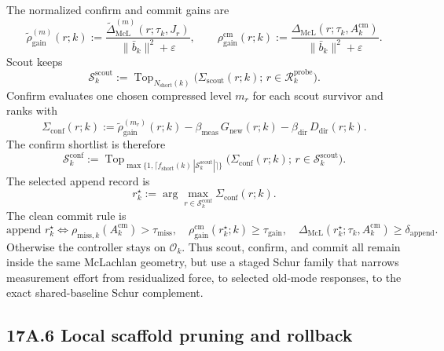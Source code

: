 \documentclass[11pt]{article}
\begin{document}
The normalized confirm and commit gains are
\[
\widetilde\rho_{\mathrm{gain}}^{(m)}(r;k)
:=
\frac{\widetilde\Delta_{\mathrm{McL}}^{(m)}(r;\tau_k,J_r)}{\|\bar b_k\|^2+\varepsilon},
\qquad
\rho_{\mathrm{gain}}^{\mathrm{cm}}(r;k)
:=
\frac{\Delta_{\mathrm{McL}}(r;\tau_k,A_k^{\mathrm{cm}})}{\|\bar b_k\|^2+\varepsilon}.
\]
Scout keeps
\[
\mathcal S_k^{\mathrm{scout}}
:=
\operatorname{Top}_{N_{\mathrm{short}}(k)}
\bigl(\Sigma_{\mathrm{scout}}(r;k);\,r\in\mathcal R_k^{\mathrm{probe}}\bigr).
\]
Confirm evaluates one chosen compressed level \(m_r\) for each scout survivor and ranks with
\[
\Sigma_{\mathrm{conf}}(r;k)
:=
\widetilde\rho_{\mathrm{gain}}^{(m_r)}(r;k)
-\beta_{\mathrm{meas}}\,G_{\mathrm{new}}(r;k)
-\beta_{\mathrm{dir}}\,D_{\mathrm{dir}}(r;k).
\]
The confirm shortlist is therefore
\[
\mathcal S_k^{\mathrm{conf}}
:=
\operatorname{Top}_{\max\{1,\lceil f_{\mathrm{short}}(k)\,|\mathcal S_k^{\mathrm{scout}}|\rceil\}}
\bigl(\Sigma_{\mathrm{conf}}(r;k);\,r\in\mathcal S_k^{\mathrm{scout}}\bigr).
\]
The selected append record is
\[
r_k^\star
:=
\arg\max_{r\in\mathcal S_k^{\mathrm{conf}}}\Sigma_{\mathrm{conf}}(r;k).
\]
The clean commit rule is
\[
\text{append }r_k^\star
\iff
\rho_{\mathrm{miss},k}(A_k^{\mathrm{cm}})>\tau_{\mathrm{miss}},
\quad
\rho_{\mathrm{gain}}^{\mathrm{cm}}(r_k^\star;k)\ge \tau_{\mathrm{gain}},
\quad
\Delta_{\mathrm{McL}}(r_k^\star;\tau_k,A_k^{\mathrm{cm}})\ge \delta_{\mathrm{append}}.
\]
Otherwise the controller stays on \(\mathcal O_k\). Thus scout, confirm, and commit all remain inside the same McLachlan geometry, but use a staged Schur family that narrows measurement effort from residualized force, to selected old-mode responses, to the exact shared-baseline Schur complement.

\subsection*{17A.6 Local scaffold pruning and rollback}
\end{document}
